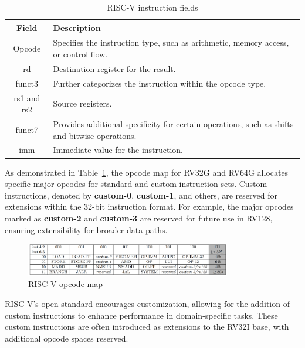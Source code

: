 \begin{table}[!h]
    \footnotesize
    \centering
    \begin{tabular}{|c|l|}
        \hline
        \textbf{Field} & \textbf{Description} \\
        \hline
        Opcode & Specifies the instruction type, such as arithmetic, memory access, or control flow. \\
        \hline
        rd & Destination register for the result. \\
        \hline
        funct3 & Further categorizes the instruction within the opcode type. \\
        \hline
        rs1 and rs2 & Source registers. \\
        \hline
        funct7 & Provides additional specificity for certain operations, such as shifts and bitwise operations. \\
        \hline
        imm & Immediate value for the instruction. \\
        \hline
    \end{tabular}
    \caption{RISC-V instruction fields}
    \label{tab:riscvfields}

\end{table}

As demonstrated in Table~\ref{fig:opcodemap}, the opcode map for RV32G and RV64G allocates specific major opcodes for standard and custom instruction sets. Custom instructions, denoted by \textbf{custom-0}, \textbf{custom-1}, and others, are reserved for extensions within the 32-bit instruction format. For example, the major opcodes marked as \textbf{custom-2} and \textbf{custom-3} are reserved for future use in RV128, ensuring extensibility for broader data paths.

\begin{figure}[!h]
    \centering
    \includegraphics[width=0.8\textwidth]{figures/opcodemap.png}
    \caption{RISC-V opcode map \cite{RISCVISA}}
    \label{fig:opcodemap}
\end{figure}

RISC-V's open standard encourages customization, allowing for the addition of custom instructions to enhance performance in domain-specific tasks. These custom instructions are often introduced as extensions to the RV32I base, with additional opcode spaces reserved.


